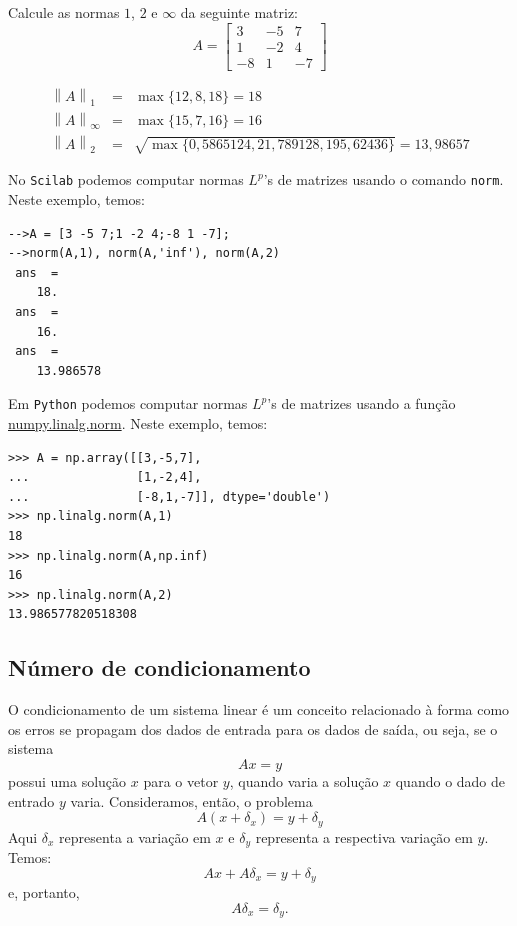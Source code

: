 \begin{ex}
Calcule as normas $1$, $2$ e $\infty$ da seguinte matriz:
\begin{equation*}
  A=\left[
\begin{array}{ccc}
3 & -5 & 7\\
1 & -2 & 4\\
-8 & 1 & -7
\end{array}
\right]
\end{equation*}
\end{ex}
\begin{sol}
  \begin{eqnarray*}
    \left\|A\right\|_1 &=& \max\{12, 8, 18\}=18\\
    \left\|A\right\|_\infty &=& \max\{15, 7, 16\}=16\\
    \left\|A\right\|_2 &=& \sqrt{\max\{0,5865124, 21,789128, 195,62436\}}= 13,98657
  \end{eqnarray*}

\ifisscilab
No \verb+Scilab+ podemos computar normas $L^p$'s de matrizes usando o comando \verb+norm+. Neste exemplo, temos:
\begin{verbatim}
-->A = [3 -5 7;1 -2 4;-8 1 -7];
-->norm(A,1), norm(A,'inf'), norm(A,2)
 ans  =
    18.  
 ans  =
    16.  
 ans  =
    13.986578
\end{verbatim}
\fi
\ifispython
Em \verb+Python+ podemos computar normas $L^p$'s de matrizes usando a função \href{https://docs.scipy.org/doc/numpy/reference/generated/numpy.linalg.norm.html#numpy.linalg.norm}{numpy.linalg.norm}. Neste exemplo, temos:
\begin{verbatim}
>>> A = np.array([[3,-5,7],
...               [1,-2,4],
...               [-8,1,-7]], dtype='double')
>>> np.linalg.norm(A,1)
18
>>> np.linalg.norm(A,np.inf)
16
>>> np.linalg.norm(A,2)
13.986577820518308
\end{verbatim}
\fi
\end{sol}

\subsection{Número de condicionamento}

O condicionamento de um sistema linear é um conceito relacionado à forma como os erros se propagam dos dados de entrada para os dados de saída, ou seja, se o sistema $$Ax=y$$
possui uma solução $x$ para o vetor $y$, quando varia a solução $x$ quando o dado de entrado $y$ varia. Consideramos, então, o problema
$$A(x+\delta_x)=y+\delta_y$$
Aqui $\delta_x$ representa a variação em $x$ e $\delta_y$ representa a respectiva variação em $y$. Temos:
$$Ax+A\delta_x=y+\delta_y$$ e, portanto,
$$A\delta_x=\delta_y.$$

